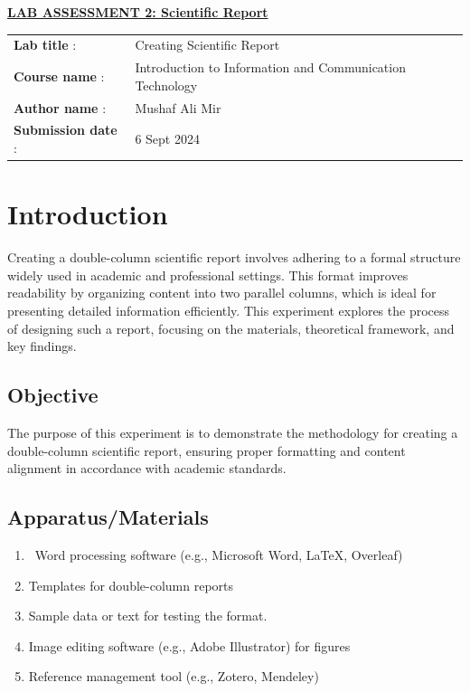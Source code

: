 \documentclass[a4paper,9pt]{article}
\begin{document}
	\newpage

	\begin{center}
	{\Huge \bfseries \underline{ LAB ASSESSMENT 2: Scientific Report} \par}
\end{center}
\noindent\begin{tabular}{@{}ll}
	\textbf{Lab title} :& Creating Scientific Report\\
	\textbf{Course name} :&  Introduction to Information and Communication Technology\\
	\textbf{Author name} : & Mushaf Ali Mir\\
	\textbf{Submission date} :& 6 Sept 2024 \\
\end{tabular}

\section*{Introduction}
\setcounter{section}{2}
\setcounter{figure}{0}  %
\setcounter{subsection}{0}

Creating a double-column scientific report involves adhering to a formal structure widely used in academic and professional settings. This format improves readability by organizing content into two parallel columns, which is ideal for presenting detailed information efficiently. This experiment explores the process of designing such a report, focusing on the materials, theoretical framework, and key findings.

\subsection{Objective}
The purpose of this experiment is to demonstrate the methodology for creating a double-column scientific report, ensuring proper formatting and content alignment in accordance with academic standards.
\subsection{Apparatus/Materials}
\begin{enumerate}
	\item\ Word processing software (e.g., Microsoft Word, LaTeX, Overleaf)
	\item Templates for double-column reports
	\item Sample data or text for testing the format.
	\item Image editing software (e.g., Adobe Illustrator) for figures
	\item Reference management tool (e.g., Zotero, Mendeley)
	
\end{enumerate}
\end{document}
